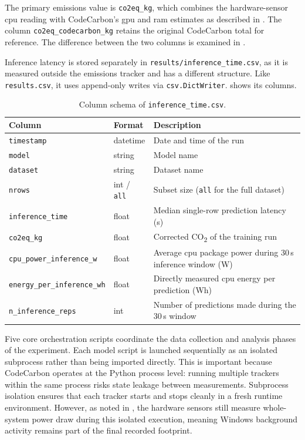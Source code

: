The primary emissions value is \texttt{co2eq\_kg}, which combines the hardware-sensor \gls{cpu} reading with CodeCarbon's \gls{gpu} and \gls{ram} estimates as described in . The column \texttt{co2eq\_codecarbon\_kg} retains the original CodeCarbon total for reference. The difference between the two columns is examined in .

Inference latency is stored separately in \texttt{results/inference\_time.csv}, as it is measured outside the emissions tracker and has a different structure. Like \texttt{results.csv}, it uses append-only writes via \texttt{csv.DictWriter}.  shows its columns.

\begin{table}[htbp]
\centering
\small
\caption{Column schema of \texttt{inference\_time.csv}.}
\label{tab:inference_schema}
\begin{tabularx}{\linewidth}{@{} l l X @{}}
\toprule
\textbf{Column} & \textbf{Format} & \textbf{Description} \\
\midrule
\texttt{timestamp}              & datetime           & Date and time of the run \\
\texttt{model}                  & string             & Model name \\
\texttt{dataset}                & string             & Dataset name \\
\texttt{nrows}                  & int / \texttt{all} & Subset size (\texttt{all} for the full dataset) \\
\texttt{inference\_time}           & float              & Median single-row prediction latency (s) \\
\texttt{co2eq\_kg}                 & float              & Corrected CO\textsubscript{2} of the training run \\
\texttt{cpu\_power\_inference\_w}  & float              & Average \gls{cpu} package power during 30\,s inference window (W) \\
\texttt{energy\_per\_inference\_wh} & float             & Directly measured \gls{cpu} energy per prediction (Wh) \\
\texttt{n\_inference\_reps}        & int                & Number of predictions made during the 30\,s window \\
\bottomrule
\end{tabularx}
\end{table}

Five core orchestration scripts coordinate the data collection and analysis phases of the experiment.
Each model script is launched sequentially as an isolated subprocess rather than being imported directly. This is important because CodeCarbon operates at the Python process level: running multiple trackers within the same process risks state leakage between measurements. Subprocess isolation ensures that each tracker starts and stops cleanly in a fresh runtime environment. However, as noted in , the hardware sensors still measure whole-system power draw during this isolated execution, meaning Windows background activity remains part of the final recorded footprint.


